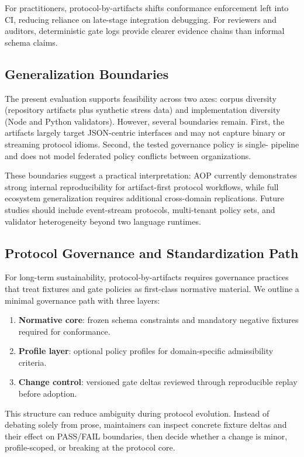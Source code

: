 \documentclass[10pt,conference]{IEEEtran}
\begin{document}
For practitioners, protocol-by-artifacts shifts conformance enforcement left
into CI, reducing reliance on late-stage integration debugging. For reviewers
and auditors, deterministic gate logs provide clearer evidence chains than
informal schema claims.

\subsection{Generalization Boundaries}

The present evaluation supports feasibility across two axes: corpus diversity
(repository artifacts plus synthetic stress data) and implementation diversity
(Node and Python validators). However, several boundaries remain. First, the
artifacts largely target JSON-centric interfaces and may not capture binary or
streaming protocol idioms. Second, the tested governance policy is single-
pipeline and does not model federated policy conflicts between organizations.

These boundaries suggest a practical interpretation: AOP currently demonstrates
strong internal reproducibility for artifact-first protocol workflows, while
full ecosystem generalization requires additional cross-domain replications.
Future studies should include event-stream protocols, multi-tenant policy sets,
and validator heterogeneity beyond two language runtimes.

\subsection{Protocol Governance and Standardization Path}

For long-term sustainability, protocol-by-artifacts requires governance practices
that treat fixtures and gate policies as first-class normative material. We
outline a minimal governance path with three layers:
\begin{enumerate}
\item \textbf{Normative core}: frozen schema constraints and mandatory negative
      fixtures required for conformance.
\item \textbf{Profile layer}: optional policy profiles for domain-specific
      admissibility criteria.
\item \textbf{Change control}: versioned gate deltas reviewed through reproducible
      replay before adoption.
\end{enumerate}

This structure can reduce ambiguity during protocol evolution. Instead of
debating solely from prose, maintainers can inspect concrete fixture deltas and
their effect on PASS/FAIL boundaries, then decide whether a change is minor,
profile-scoped, or breaking at the protocol core.
\end{document}
